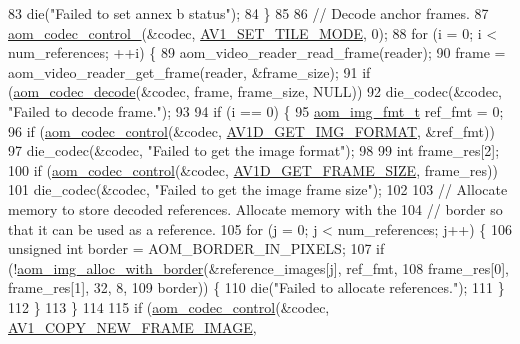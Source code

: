 \begin{DoxyCodeInclude}
{{{{83     die(\textcolor{stringliteral}{"Failed to set annex b status"});
84   \}
85 
86   \textcolor{comment}{// Decode anchor frames.}
87   \hyperlink{group__codec_ga51eb332a40dcacc39000ab8e0be36b79}{aom\_codec\_control\_}(&codec, \hyperlink{group__aom__decoder_gga3865fd4b3192489baa9a5c3632ebe97ba0795d8084ae8c78528c01587198df9e2}{AV1\_SET\_TILE\_MODE}, 0);
88   \textcolor{keywordflow}{for} (i = 0; i < num\_references; ++i) \{
89     aom\_video\_reader\_read\_frame(reader);
90     frame = aom\_video\_reader\_get\_frame(reader, &frame\_size);
91     \textcolor{keywordflow}{if} (\hyperlink{group__decoder_gab03fdb999d1f83a5896869a3ba5f68f7}{aom\_codec\_decode}(&codec, frame, frame\_size, NULL))
92       die\_codec(&codec, \textcolor{stringliteral}{"Failed to decode frame."});
93 
94     \textcolor{keywordflow}{if} (i == 0) \{
95       \hyperlink{aom__image_8h_ab71efff8c7f49380fad23b93bc2e9bfc}{aom\_img\_fmt\_t} ref\_fmt = 0;
96       \textcolor{keywordflow}{if} (\hyperlink{group__codec_ga6da974f4eeaba1fa74106b28d0fe6ac5}{aom\_codec\_control}(&codec, \hyperlink{group__aom__decoder_gga3865fd4b3192489baa9a5c3632ebe97bacd7229e5fb766670fe995739931c2ee3}{AV1D\_GET\_IMG\_FORMAT}, &ref\_fmt))
97         die\_codec(&codec, \textcolor{stringliteral}{"Failed to get the image format"});
98 
99       \textcolor{keywordtype}{int} frame\_res[2];
100       \textcolor{keywordflow}{if} (\hyperlink{group__codec_ga6da974f4eeaba1fa74106b28d0fe6ac5}{aom\_codec\_control}(&codec, \hyperlink{group__aom__decoder_gga3865fd4b3192489baa9a5c3632ebe97ba175c454a7adf2d3927a0e979b4a2b07b}{AV1D\_GET\_FRAME\_SIZE}, frame\_res))
101         die\_codec(&codec, \textcolor{stringliteral}{"Failed to get the image frame size"});
102 
103       \textcolor{comment}{// Allocate memory to store decoded references. Allocate memory with the}
104       \textcolor{comment}{// border so that it can be used as a reference.}
105       \textcolor{keywordflow}{for} (j = 0; j < num\_references; j++) \{
106         \textcolor{keywordtype}{unsigned} \textcolor{keywordtype}{int} border = AOM\_BORDER\_IN\_PIXELS;
107         \textcolor{keywordflow}{if} (!\hyperlink{aom__image_8h_aeb211e5184687f7e10d7c5bed4dcfdcd}{aom\_img\_alloc\_with\_border}(&reference\_images[j], ref\_fmt,
108                                        frame\_res[0], frame\_res[1], 32, 8,
109                                        border)) \{
110           die(\textcolor{stringliteral}{"Failed to allocate references."});
111         \}
112       \}
113     \}
114 
115     \textcolor{keywordflow}{if} (\hyperlink{group__codec_ga6da974f4eeaba1fa74106b28d0fe6ac5}{aom\_codec\_control}(&codec, \hyperlink{group__aom_gga9421a1fa78c0d9587ae5aa6c1cb3d659ae41763622ee33cd99e23ca8f78a3f8fa}{AV1\_COPY\_NEW\_FRAME\_IMAGE},
}}}}
\end{DoxyCodeInclude}
